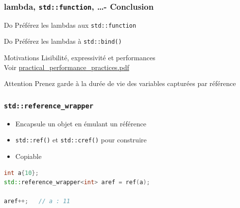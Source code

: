 \documentclass[C++.tex]{subfiles}
\begin{document}
\begin{frame}[fragile]
	\frametitle{lambda, \lstinline|std::function|, \ldots - Conclusion}
	\begin{exampleblock}{Do}
		Préférez les lambdas aux \lstinline|std::function|
	\end{exampleblock}

	\begin{exampleblock}{Do}
		Préférez les lambdas à \lstinline|std::bind()|
	\end{exampleblock}


	\begin{block}{Motivations}
		Lisibilité, expressivité et performances \\
		Voir \href{https://github.com/boostcon/cppnow_presentations_2016/blob/master/00_tuesday/practical_performance_practices.pdf}{practical\_performance\_practices.pdf}

	\end{block}

	\begin{alertblock}{Attention}
		Prenez garde à la durée de vie des variables capturées par référence
	\end{alertblock}
\end{frame}

\begin{frame}[fragile]
	\frametitle{\lstinline|std::reference_wrapper|}
	\begin{itemize}
		\item Encapsule un objet en émulant un référence
		\item \lstinline|std::ref()| et \lstinline|std::cref()| pour construire
		\item Copiable
	\end{itemize}

	\begin{lstlisting}[language=C++]
int a{10};
std::reference_wrapper<int> aref = ref(a);

aref++;   // a : 11\end{lstlisting}
\end{frame}
\end{document}

